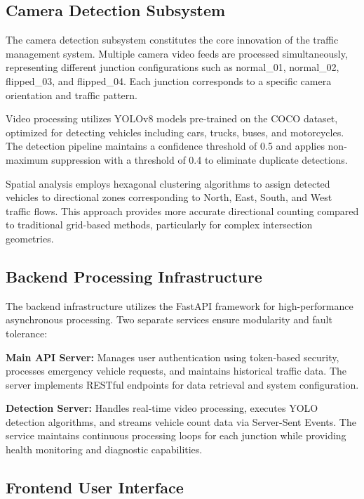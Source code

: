 \documentclass[conference]{IEEEtran}
\begin{document}
\subsection{Camera Detection Subsystem}

The camera detection subsystem constitutes the core innovation of the traffic management system. Multiple camera video feeds are processed simultaneously, representing different junction configurations such as normal\_01, normal\_02, flipped\_03, and flipped\_04. Each junction corresponds to a specific camera orientation and traffic pattern.

Video processing utilizes YOLOv8 models pre-trained on the COCO dataset, optimized for detecting vehicles including cars, trucks, buses, and motorcycles. The detection pipeline maintains a confidence threshold of 0.5 and applies non-maximum suppression with a threshold of 0.4 to eliminate duplicate detections.

Spatial analysis employs hexagonal clustering algorithms to assign detected vehicles to directional zones corresponding to North, East, South, and West traffic flows. This approach provides more accurate directional counting compared to traditional grid-based methods, particularly for complex intersection geometries.

\subsection{Backend Processing Infrastructure}

The backend infrastructure utilizes the FastAPI framework for high-performance asynchronous processing. Two separate services ensure modularity and fault tolerance:

\textbf{Main API Server:} Manages user authentication using token-based security, processes emergency vehicle requests, and maintains historical traffic data. The server implements RESTful endpoints for data retrieval and system configuration.

\textbf{Detection Server:} Handles real-time video processing, executes YOLO detection algorithms, and streams vehicle count data via Server-Sent Events. The service maintains continuous processing loops for each junction while providing health monitoring and diagnostic capabilities.

\subsection{Frontend User Interface}
\end{document}
